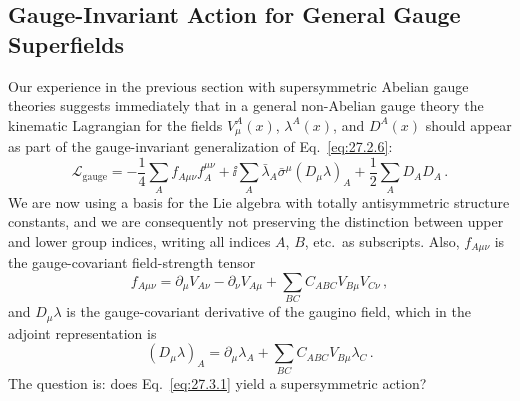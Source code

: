 
\subsection{Gauge-Invariant Action for General Gauge Superfields}

Our experience in the previous section with supersymmetric Abelian gauge
theories suggests immediately that in a general non-Abelian gauge theory
the kinematic Lagrangian for the fields \(V_\mu^A(x)\), \(\lambda^A(x)\),
and \(D^A(x)\) should appear as part of the gauge-invariant generalization
of Eq.~\eqref{eq:27.2.6}:
\begin{equation}
  \mathcal{L}_{\mathrm{gauge}}
  =-\frac14\sum_A f_{A\mu\nu}f_A^{\mu\nu}
  +\ii\sum_A\bar\lambda_A\bar\sigma^\mu(D_\mu\lambda)_A
  +\frac12\sum_A D_A D_A\,.
  \tag{27.3.1}\label{eq:27.3.1}
\end{equation}
We are now using a basis for the Lie algebra with totally antisymmetric
structure constants, and we are consequently not preserving the distinction
between upper and lower group indices, writing all indices \(A\), \(B\), etc.\
as subscripts. Also, \(f_{A\mu\nu}\) is the gauge-covariant field-strength
tensor
\begin{equation}
  f_{A\mu\nu}
  =\partial_\mu V_{A\nu}-\partial_\nu V_{A\mu}
  +\sum_{BC}C_{ABC}V_{B\mu}V_{C\nu}\,,
  \tag{27.3.2}\label{eq:27.3.2}
\end{equation}
and \(D_\mu\lambda\) is the gauge-covariant derivative of the gaugino field,
which in the adjoint representation is
\begin{equation}
  (D_\mu\lambda)_A
  =\partial_\mu\lambda_A+\sum_{BC}C_{ABC}V_{B\mu}\lambda_C\,.
  \tag{27.3.3}\label{eq:27.3.3}
\end{equation}
The question is: does Eq.~\eqref{eq:27.3.1} yield a supersymmetric action?

